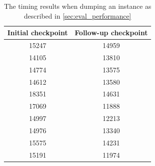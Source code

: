 \begin{table}
  \begin{tabular}{| c | c |}
    \hline
    Initial checkpoint & Follow-up checkpoint \\
    \hline
    15247 & 14959 \\
    \hline
    14105 & 13810 \\
    \hline
    14774 & 13575 \\
    \hline
    14612 & 13580 \\
    \hline
    18351 & 14631 \\
    \hline
    17069 & 11888 \\
    \hline
    14997 & 12213 \\
    \hline
    14976 & 13340 \\
    \hline
    15575 & 14231 \\
    \hline
    15191 & 11974 \\
    \hline
  \end{tabular}
  \caption{The timing results when dumping an instance as described in \autoref{sec:eval_performance}}
  \label{tab:benchmark}
\end{table}